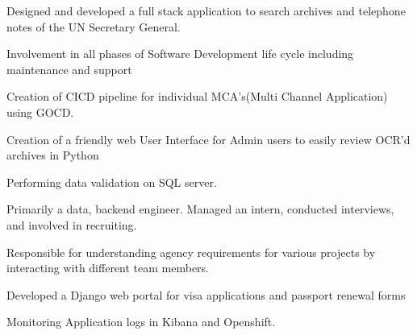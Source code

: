 \documentclass[]{deedy-resume-openfont}
\begin{document}
\begin{minipage}[t][18cm]{0.66\textwidth}
\begin{tightemize}
\item Designed and developed a full stack application to search archives and telephone notes of the UN Secretary General.
\item Involvement in all phases of Software Development life cycle including maintenance and support 
\item Creation of CICD pipeline for individual MCA's(Multi Channel Application) using GOCD.
\item  Creation of a friendly web User Interface for Admin users to easily review OCR'd archives in Python
\item Performing data validation on SQL server.
\end{tightemize}
\sectionsep

\begin{tightemize}
\item Primarily a data, backend engineer. Managed an
intern, conducted interviews, and involved in recruiting.
\item Responsible for understanding agency requirements for various projects by interacting with different team members.
\item Developed a Django web portal for visa applications and passport renewal forms
\item Monitoring Application logs in Kibana and Openshift.

\end{tightemize}
\sectionsep





\end{minipage}
\end{document}
